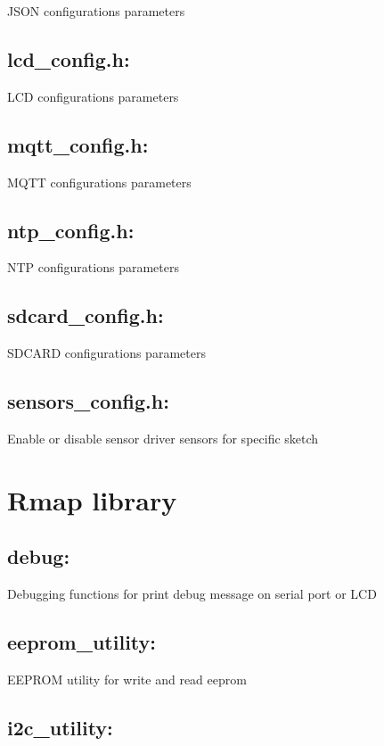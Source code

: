 J\+S\+ON configuration\textquotesingle{}s parameters\hypertarget{index_lcd_config}{}\subsection{lcd\+\_\+config.\+h\+:}\label{index_lcd_config}
L\+CD configuration\textquotesingle{}s parameters\hypertarget{index_mqtt_config}{}\subsection{mqtt\+\_\+config.\+h\+:}\label{index_mqtt_config}
M\+Q\+TT configuration\textquotesingle{}s parameters\hypertarget{index_ntp_config}{}\subsection{ntp\+\_\+config.\+h\+:}\label{index_ntp_config}
N\+TP configuration\textquotesingle{}s parameters\hypertarget{index_sdcard_config}{}\subsection{sdcard\+\_\+config.\+h\+:}\label{index_sdcard_config}
S\+D\+C\+A\+RD configuration\textquotesingle{}s parameters\hypertarget{index_sensors_config}{}\subsection{sensors\+\_\+config.\+h\+:}\label{index_sensors_config}
Enable or disable sensor driver sensors for specific sketch\hypertarget{index_Rmap}{}\section{Rmap library}\label{index_Rmap}
\hypertarget{index_debug}{}\subsection{debug\+:}\label{index_debug}
Debugging functions for print debug message on serial port or L\+CD\hypertarget{index_eeprom_utility}{}\subsection{eeprom\+\_\+utility\+:}\label{index_eeprom_utility}
E\+E\+P\+R\+OM utility for write and read eeprom\hypertarget{index_i2c_utility}{}\subsection{i2c\+\_\+utility\+:}\label{index_i2c_utility}
